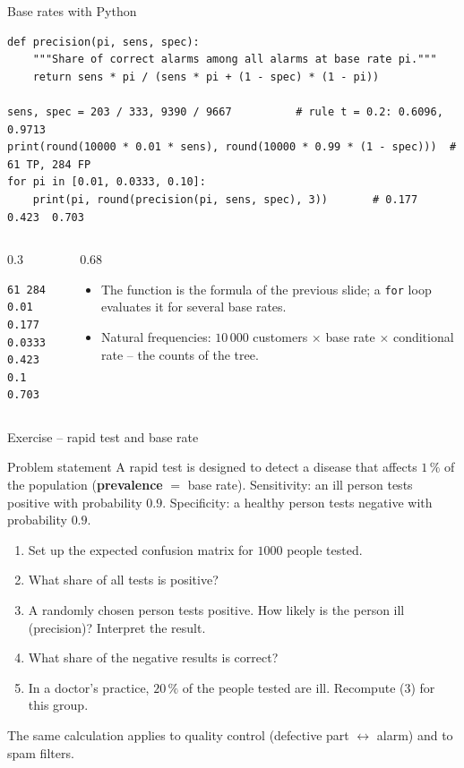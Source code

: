 \documentclass[aspectratio=169,11pt]{beamer}
\begin{document}
\begin{frame}[fragile]{Base rates with Python}
\begin{lstlisting}
def precision(pi, sens, spec):
    """Share of correct alarms among all alarms at base rate pi."""
    return sens * pi / (sens * pi + (1 - spec) * (1 - pi))

sens, spec = 203 / 333, 9390 / 9667          # rule t = 0.2: 0.6096, 0.9713
print(round(10000 * 0.01 * sens), round(10000 * 0.99 * (1 - spec)))  # 61 TP, 284 FP
for pi in [0.01, 0.0333, 0.10]:
    print(pi, round(precision(pi, sens, spec), 3))       # 0.177  0.423  0.703
\end{lstlisting}
  \begin{columns}[T]
    \begin{column}{0.3\textwidth}
\begin{lstlisting}[style=Pyout]
61 284
0.01 0.177
0.0333 0.423
0.1 0.703
\end{lstlisting}
    \end{column}
    \begin{column}{0.68\textwidth}
      \small
      \begin{itemize}\setlength{\itemsep}{3pt}
        \item The function is the formula of the previous slide; a
              \texttt{for} loop evaluates it for several base rates.
        \item Natural frequencies: $10\,000$ customers $\times$ base rate
              $\times$ conditional rate -- the counts of the tree.
      \end{itemize}
    \end{column}
  \end{columns}
\end{frame}

\begin{frame}{Exercise -- rapid test and base rate}
  \begin{block}{Problem statement}
    A rapid test is designed to detect a disease that affects $1\,\%$ of the
    population (\textbf{prevalence} $=$ base rate). Sensitivity: an ill
    person tests positive with probability $0.9$. Specificity: a healthy
    person tests negative with probability $0.9$.
    \begin{enumerate}
      \item Set up the expected confusion matrix for $1000$ people tested.
      \item What share of all tests is positive?
      \item A randomly chosen person tests positive. How likely is the person
            ill (precision)? Interpret the result.
      \item What share of the negative results is correct?
      \item In a doctor's practice, $20\,\%$ of the people tested are ill.
            Recompute (3) for this group.
    \end{enumerate}
  \end{block}
  {\footnotesize The same calculation applies to quality control (defective
  part $\leftrightarrow$ alarm) and to spam filters.\par}
\end{frame}
\end{document}
